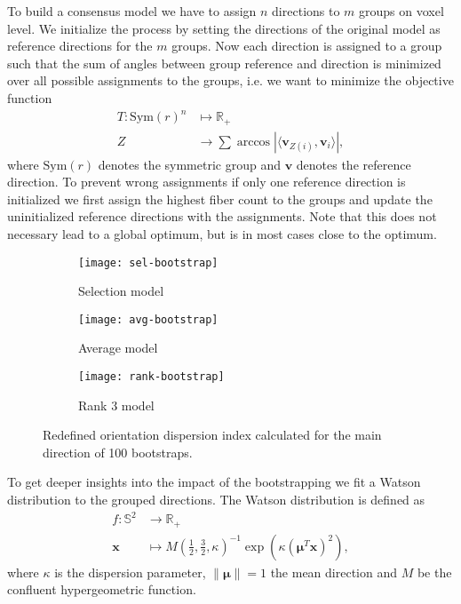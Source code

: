 To build a consensus model we have to assign $n$ directions to $m$ groups on voxel
level. We initialize the process by setting the directions of the original model
as reference directions for the $m$ groups. Now each
direction is assigned to a group such that the sum of angles between group
reference and direction is minimized over all possible assignments to the
groups, i.e. we want to minimize the objective function 
\begin{align}
	T : \text{Sym} \left( r \right)^n & \mapsto \mathbb{R}_+ \nonumber \\
	Z & \rightarrow \sum \arccos | \langle \mathbf{v}_{Z\left( i
	\right)}, \mathbf{v}_i \rangle | ,  
\end{align} 
where $\text{Sym}\left( r \right)$ denotes the symmetric group and $\mathbf{v}$ denotes
the reference direction. To prevent wrong assignments if only one reference
direction is initialized we first assign the highest fiber count to the
groups and update the uninitialized reference directions with the assignments.
Note that this does not necessary lead to a global optimum, but is in most cases
close to the optimum. 

\begin{figure*}[t]
	\centering
	\begin{subfigure}[b]{0.33\linewidth}
		\texttt{[image: sel-bootstrap]}
		\caption{Selection model}
	\end{subfigure}
	\begin{subfigure}[b]{0.33\linewidth}
		\texttt{[image: avg-bootstrap]}
		\caption{Average model}
	\end{subfigure}
	\begin{subfigure}[b]{0.33\linewidth}
		\texttt{[image: rank-bootstrap]}
		\caption{Rank 3 model}
	\end{subfigure}
	\caption{Redefined orientation dispersion index calculated for the main
	direction of 100 bootstraps.}
	\label{fig:dispersion}
\end{figure*}

To get deeper insights into the impact of the bootstrapping we fit a Watson
distribution to the grouped directions. The Watson distribution is defined as  
\begin{align*}
	f : \mathbb{S}^2 & \longrightarrow  \mathbb{R}_+ \\
	\mathbf{x} & \longmapsto  M \left( \frac{1}{2}, \frac{3}{2} , \kappa
	\right)^{-1} \exp \left(  \kappa
	\left( \mathbf{\mu}^T \mathbf{x} \right)^2 
	\right) 	,  
\end{align*}
where $\kappa$ is the dispersion parameter, $\| \mathbf{\mu} \| = 1$ the
mean direction and $M$ be the confluent hypergeometric function. 

